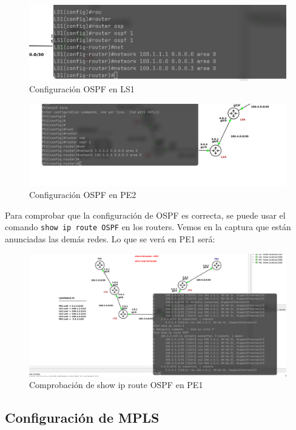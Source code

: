 \documentclass{article}
\begin{document}
\begin{figure}[h]
    \centering
    \includegraphics[width=1\textwidth]{src/ospfls1.png}
    \caption{Configuración OSPF en LS1}
\end{figure}

\begin{figure}[h]
    \centering
    \includegraphics[width=1\textwidth]{src/pe1ospf.png}
    \caption{Configuración OSPF en PE2}
\end{figure}

Para comprobar que la configuración de OSPF es correcta, se puede usar el comando \texttt{show ip route OSPF} en los routers. Vemos en la captura que están anunciadas las demás redes. Lo que se verá en PE1 será:

\begin{figure}[h]
    \centering
    \includegraphics[width=1\textwidth]{src/segunda.png}
    \caption{Comprobación de show ip route OSPF en PE1}
\end{figure}

\newpage

\subsection{Configuración de MPLS}
\end{document}
